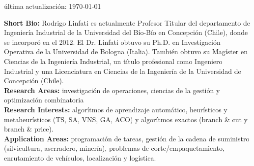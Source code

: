 \makecvtitle
\'ultima actualizaci\'on: \today

\textbf{Short Bio:} Rodrigo Linfati es actualmente Profesor Titular del departamento de Ingenier\'ia Industrial de la Universidad del B\'io-B\'io en Concepci\'on (Chile), donde se incorpor\'o en el 2012. El Dr. Linfati obtuvo su Ph.D. en Investigaci\'on Operativa de la Universidad de Bologna (Italia). Tambi\'en obtuvo su Mag\'ister en Ciencias de la Ingenier\'ia Industrial, un t\'itulo profesional como Ingeniero Industrial y una Licenciatura en Ciencias de la Ingenier\'ia de la Universidad de Concepci\'on (Chile).
~ \\
\textbf{Research Areas:} investigaci\'on de operaciones, ciencias de la gesti\'on y optimizaci\'on combinatoria
~ \\
\textbf{Research Interests:} algor\'itmos de aprendizaje autom\'atico, heur\'isticos y metaheur\'isticos (TS, SA, VNS, GA, ACO) y algor\'itmos exactos (branch \& cut y branch \& price).
~ \\
\textbf{Application Areas:} programaci\'on de tareas, gesti\'on de la cadena de suministro (silvicultura, aserradero, miner\'ia), problemas de corte/empaquetamiento, enrutamiento de veh\'iculos, localizaci\'on y log\'istica.

\clearpage